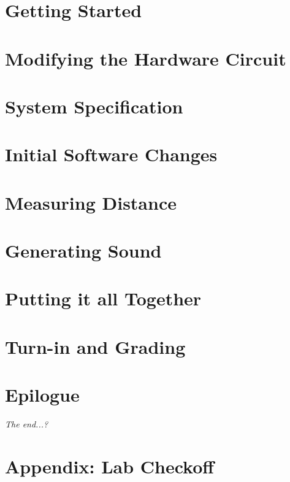     \section{Getting Started} \label{sec:GettingStarted}                

    \section{Modifying the Hardware Circuit} \label{sec:hardwareMods}   

    \section{System Specification} \label{sec:spec}                     

    \section{Initial Software Changes} \label{sec:initialSoftware}      


    \section{Measuring Distance} \label{sec:distance}                   

    \section{Generating Sound} \label{sec:sound}                        

    \section{Putting it all Together} \label{sec:integration}           

    \section{Turn-in and Grading}                                       

    \section*{Epilogue}                                                 \RangeFinderDetecting

    \textit{The end...?}

    \appendix

    \section{Appendix: Lab Checkoff}                                    


